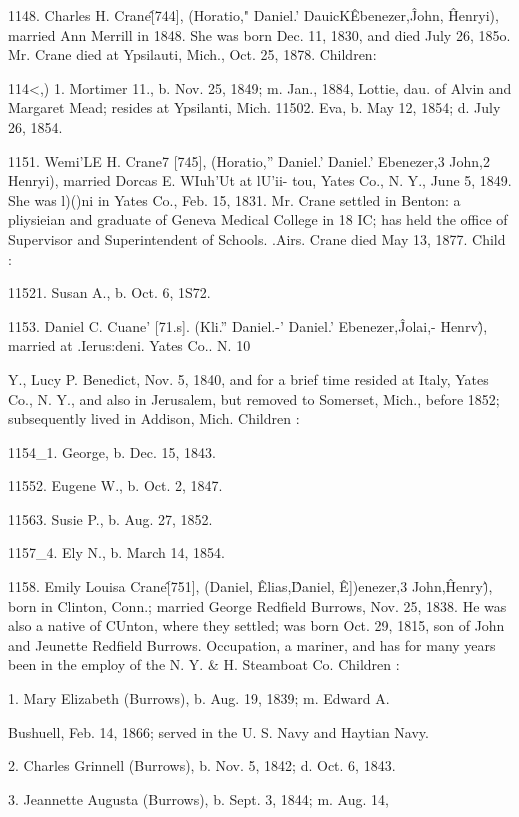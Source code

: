 1148. Charles H. Crane\^ [744], (Horatio," Daniel.' DauicK\^ 
Ebenezer,\^ John, \^ Henryi), married Ann Merrill in 1848. She 
was born Dec. 11, 1830, and died July 26, 185o. Mr. Crane 
died at Ypsilauti, Mich., Oct. 25, 1878. Children: 

114<,) 1. Mortimer 11., b. Nov. 25, 1849; m. Jan., 1884, Lottie, dau. 
of Alvin and Margaret Mead; resides at Ypsilanti, Mich. 
11502. Eva, b. May 12, 1854; d. July 26, 1854. 

1151. Wemi'LE H. Crane7 [745], (Horatio,'' Daniel.' Daniel.' 
Ebenezer,3 John,2 Henryi), married Dorcas E. WIuh'Ut at lU'ii- 
tou, Yates Co., N. Y., June 5, 1849. She was l)()ni in Yates 
Co., Feb. 15, 1831. Mr. Crane settled in Benton: a pliysieian 
and graduate of Geneva Medical College in 18 IC; has held the 
office of Supervisor and Superintendent of Schools. .Airs. Crane 
died May 13, 1877. Child : 

11521. Susan A., b. Oct. 6, 1S72. 

1153. Daniel C. Cuane' [71.s]. (Kli.'' Daniel.-' Daniel.' 
Ebenezer,\^ Jolai,- Henrv\^), married at .Ierus:deni. Yates Co.. N. 
10 




Y., Lucy P. Benedict, Nov. 5, 1840, and for a brief time resided 
at Italy, Yates Co., N. Y., and also in Jerusalem, but removed 
to Somerset, Mich., before 1852; subsequently lived in Addison, 
Mich. Children : 

1154\_1. George, b. Dec. 15, 1843. 

11552. Eugene W., b. Oct. 2, 1847. 

11563. Susie P., b. Aug. 27, 1852. 

1157\_4. Ely N., b. March 14, 1854. 

1158. Emily Louisa Crane\^ [751], (Daniel, \^ Elias,\^ Daniel, \^ 
E])enezer,3 John,\^ Henry\^), born in Clinton, Conn.; married 
George Redfield Burrows, Nov. 25, 1838. He was also a native 
of CUnton, where they settled; was born Oct. 29, 1815, son of 
John and Jeunette Redfield Burrows. Occupation, a mariner, 
and has for many years been in the employ of the N. Y. \& H. 
Steamboat Co. Children : 

1. Mary Elizabeth (Burrows), b. Aug. 19, 1839; m. Edward A. 

Bushuell, Feb. 14, 1866; served in the U. S. Navy and Haytian 
Navy. 

2. Charles Grinnell (Burrows), b. Nov. 5, 1842; d. Oct. 6, 1843. 

3. Jeannette Augusta (Burrows), b. Sept. 3, 1844; m. Aug. 14, 

